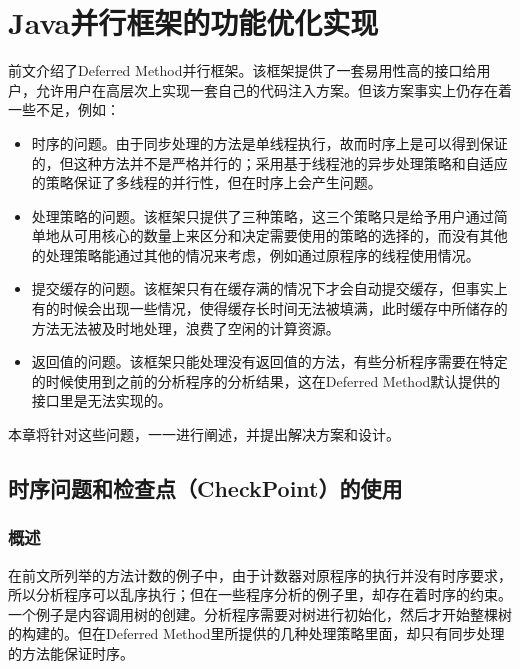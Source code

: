 
\chapter{Java并行框架的功能优化实现}

前文介绍了Deferred Method并行框架。该框架提供了一套易用性高的接口给用户，允许用户在高层次上实现一套自己的代码注入方案。但该方案事实上仍存在着一些不足，例如：

\begin{itemize}
	\item 时序的问题。由于同步处理的方法是单线程执行，故而时序上是可以得到保证的，但这种方法并不是严格并行的；采用基于线程池的异步处理策略和自适应的策略保证了多线程的并行性，但在时序上会产生问题。
	\item 处理策略的问题。该框架只提供了三种策略，这三个策略只是给予用户通过简单地从可用核心的数量上来区分和决定需要使用的策略的选择的，而没有其他的处理策略能通过其他的情况来考虑，例如通过原程序的线程使用情况。
	\item 提交缓存的问题。该框架只有在缓存满的情况下才会自动提交缓存，但事实上有的时候会出现一些情况，使得缓存长时间无法被填满，此时缓存中所储存的方法无法被及时地处理，浪费了空闲的计算资源。
	\item 返回值的问题。该框架只能处理没有返回值的方法，有些分析程序需要在特定的时候使用到之前的分析程序的分析结果，这在Deferred Method默认提供的接口里是无法实现的。
\end{itemize}
		
本章将针对这些问题，一一进行阐述，并提出解决方案和设计。

\section{时序问题和检查点（CheckPoint）的使用}

\subsection{概述}

在前文所列举的方法计数的例子中，由于计数器对原程序的执行并没有时序要求，所以分析程序可以乱序执行；但在一些程序分析的例子里，却存在着时序的约束。一个例子是内容调用树的创建。分析程序需要对树进行初始化，然后才开始整棵树的构建的。但在Deferred Method里所提供的几种处理策略里面，却只有同步处理的方法能保证时序。

